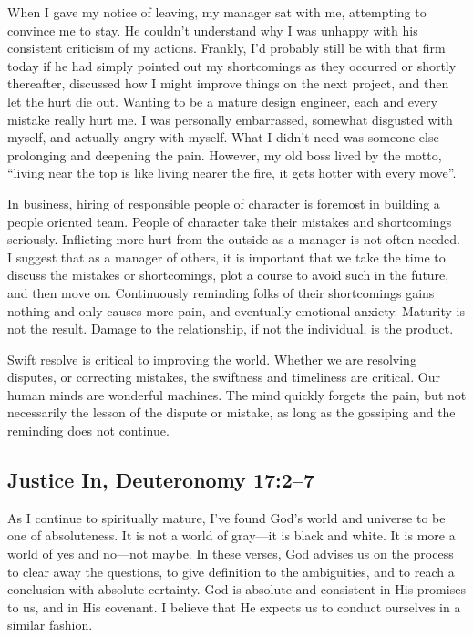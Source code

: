 \documentclass[12pt]{memoir}
\begin{document}
When I gave my notice of leaving, my manager sat with me, attempting
to convince me to stay. He couldn't understand why I was unhappy with
his consistent criticism of my actions. Frankly, I'd probably still
be with that firm today if he had simply pointed out my shortcomings
as they occurred or shortly thereafter, discussed how I might improve
things on the next project, and then let the hurt die out. Wanting
to be a mature design engineer, each and every mistake really hurt
me. I was personally embarrassed, somewhat disgusted with myself,
and actually angry with myself. What I didn't need was someone else
prolonging and deepening the pain. However, my old boss lived by the
motto, ``living near the top is like living nearer the fire, it gets
hotter with every move''.

In business, hiring of responsible people of character is foremost in building a people oriented team. People of character take
their mistakes and shortcomings seriously. Inflicting more hurt from
the outside as a manager is not often needed. I suggest that as
a manager of others, it is important that we take the time to discuss
the mistakes or shortcomings, plot a course to avoid such in the future,
and then move on. Continuously reminding folks of their shortcomings
gains nothing and only causes more pain, and eventually emotional
anxiety. Maturity is not the result. Damage to the relationship, if
not the individual, is the product.

Swift resolve is critical to improving the world. Whether we are resolving
disputes, or correcting mistakes, the swiftness and timeliness are
critical. Our human minds are wonderful machines. The mind quickly
forgets the pain, but not necessarily the lesson of the dispute or
mistake, as long as the gossiping and the reminding does not
continue. 

\subsection[Justice In]{Justice In, Deuteronomy 17:2--7}

As I continue to spiritually mature, I've found God's world and universe
to be one of absoluteness. It is not a world of gray---it is black
and white. It is more a world of yes and no---not maybe. In these
verses, God advises us on the process to clear away the questions,
to give definition to the ambiguities, and to reach a conclusion with
absolute certainty. God is absolute and consistent in His promises
to us, and in His covenant. I believe that He expects us to conduct
ourselves in a similar fashion.
\end{document}
